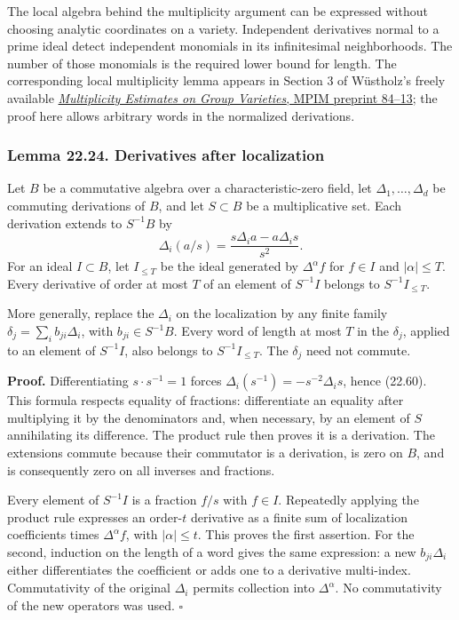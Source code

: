\documentclass[
  11pt,
  a4paper,
]{article}
\begin{document}
The local algebra behind the multiplicity argument can be expressed
without choosing analytic coordinates on a variety. Independent
derivatives normal to a prime ideal detect independent monomials in its
infinitesimal neighborhoods. The number of those monomials is the
required lower bound for length. The corresponding local multiplicity
lemma appears in Section 3 of Wüstholz's freely available
\href{https://archive.mpim-bonn.mpg.de/1364/1/preprint_1984_13.pdf}{\emph{Multiplicity
Estimates on Group Varieties}, MPIM preprint 84--13}; the proof here
allows arbitrary words in the normalized derivations.

\subsubsection{Lemma 22.24. Derivatives after
localization}\label{lemma-22.24.-derivatives-after-localization}

Let \(B\) be a commutative algebra over a characteristic-zero field, let
\(\Delta_1,\ldots,\Delta_d\) be commuting derivations of \(B\), and let
\(S\subset B\) be a multiplicative set. Each derivation extends to
\(S^{-1}B\) by \[
 \Delta_i(a/s)=\frac{s\Delta_i a-a\Delta_i s}{s^2}.
 \tag{22.60}
\] For an ideal \(I\subset B\), let \(I_{\le T}\) be the ideal generated
by \(\Delta^\alpha f\) for \(f\in I\) and \(|\alpha|\le T\). Every
derivative of order at most \(T\) of an element of \(S^{-1}I\) belongs
to \(S^{-1}I_{\le T}\).

More generally, replace the \(\Delta_i\) on the localization by any
finite family \(\delta_j=\sum_i b_{ji}\Delta_i\), with
\(b_{ji}\in S^{-1}B\). Every word of length at most \(T\) in the
\(\delta_j\), applied to an element of \(S^{-1}I\), also belongs to
\(S^{-1}I_{\le T}\). The \(\delta_j\) need not commute.

\textbf{Proof.} Differentiating \(s\cdot s^{-1}=1\) forces
\(\Delta_i(s^{-1})=-s^{-2}\Delta_i s\), hence (22.60). This formula
respects equality of fractions: differentiate an equality after
multiplying it by the denominators and, when necessary, by an element of
\(S\) annihilating its difference. The product rule then proves it is a
derivation. The extensions commute because their commutator is a
derivation, is zero on \(B\), and is consequently zero on all inverses
and fractions.

Every element of \(S^{-1}I\) is a fraction \(f/s\) with \(f\in I\).
Repeatedly applying the product rule expresses an order-\(t\) derivative
as a finite sum of localization coefficients times \(\Delta^\alpha f\),
with \(|\alpha|\le t\). This proves the first assertion. For the second,
induction on the length of a word gives the same expression: a new
\(b_{ji}\Delta_i\) either differentiates the coefficient or adds one to
a derivative multi-index. Commutativity of the original \(\Delta_i\)
permits collection into \(\Delta^\alpha\). No commutativity of the new
operators was used. \(\square\)
\end{document}
